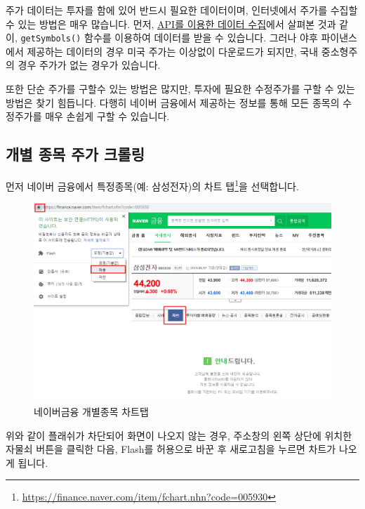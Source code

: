 \documentclass[]{book}
\let\rmarkdownfootnote\footnote%
\def\footnote{\protect\rmarkdownfootnote}
\begin{document}
주가 데이터는 투자를 함에 있어 반드시 필요한 데이터이며, 인터넷에서 주가를 수집할 수 있는 방법은 매우 많습니다. 먼저, \protect\hyperlink{api---}{API를 이용한 데이터 수집}에서 살펴본 것과 같이, \texttt{getSymbols()} 함수를 이용하여 데이터를 받을 수 있습니다. 그러나 야후 파이낸스에서 제공하는 데이터의 경우 미국 주가는 이상없이 다운로드가 되지만, 국내 중소형주의 경우 주가가 없는 경우가 있습니다.

또한 단순 주가를 구할수 있는 방법은 많지만, 투자에 필요한 수정주가를 구할 수 있는 방법은 찾기 힘듭니다. 다행히 네이버 금융에서 제공하는 정보를 통해 모든 종목의 수정주가를 매우 손쉽게 구할 수 있습니다.

\hypertarget{section-24}{%
\subsection{개별 종목 주가 크롤링}\label{section-24}}

먼저 네이버 금융에서 특정종목(예: 삼성전자)의 차트 탭\footnote{\url{https://finance.naver.com/item/fchart.nhn?code=005930}}을 선택합니다.

\begin{figure}

{\centering \includegraphics[width=1\linewidth]{images/crawl_practice_price} 

}

\caption{네이버금융 개별종목 차트탭}\label{fig:unnamed-chunk-1}
\end{figure}

위와 같이 플래쉬가 차단되어 화면이 나오지 않는 경우, 주소창의 왼쪽 상단에 위치한 자물쇠 버튼을 클릭한 다음, Flash를 허용으로 바꾼 후 새로고침을 누르면 차트가 나오게 됩니다.
\end{document}
